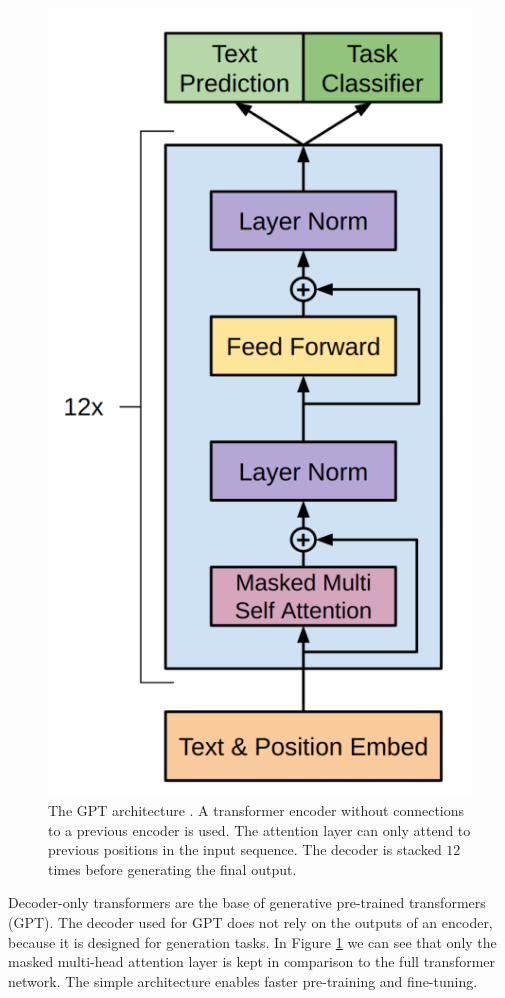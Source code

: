 \documentclass[../main.tex]{subfiles}
\begin{document}
\begin{figure}[t]
    \centering
    \includegraphics[scale=0.3]{include/images/gpt_architecture.png}
    \caption{
        The GPT architecture \cite{Radford2018}.
        A transformer encoder
        without connections to a previous encoder is used.
        The attention layer
        can only attend to previous positions in the input sequence.
        The decoder is stacked $12$ times before generating the final output.
    }
    \label{fig:gpt_arch}
\end{figure}


Decoder-only transformers are the base of generative pre-trained transformers (GPT).
The decoder used for GPT does not rely on the outputs of an encoder,
because it is designed for generation tasks.
In Figure \ref{fig:gpt_arch} we can see
that only the masked multi-head attention layer is kept in comparison to
the full transformer network.
The simple architecture enables faster pre-training and fine-tuning.
\end{document}

